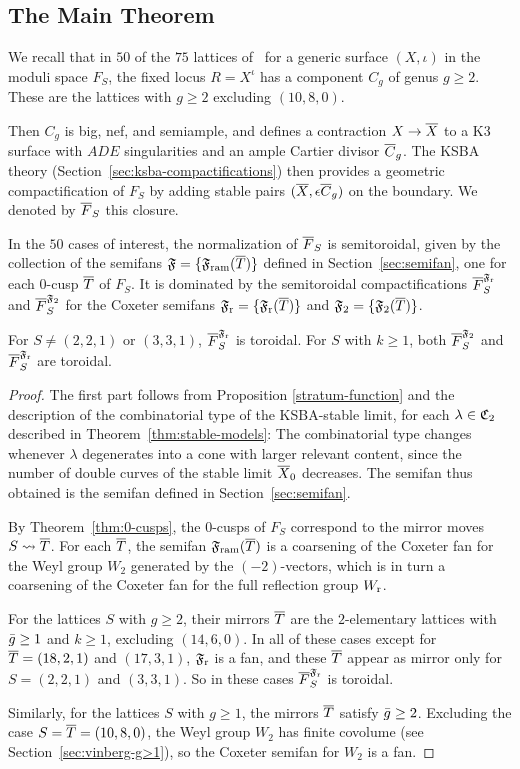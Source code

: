 \documentclass{amsart}
\begin{document}
\subsection{The Main Theorem}
\label{sec:proof-main-thm}

We recall that in $50$ of the $75$ lattices of \fign\ for a generic
surface $(X,\iota)$ in the moduli space $F_S$, the fixed locus
$R=X^\iota$ has a component $C_g$ of genus $g\ge2$.  These are the
lattices with $g\ge2$ excluding $(10,8,0)$.

Then $C_g$ is big, nef, and semiample, and defines a contraction
$X\to{\overline X}$ to a K3 surface with $ADE$ singularities and an ample
Cartier divisor ${\overline C}_g$. The KSBA theory
(Section~\ref{sec:ksba-compactifications}) then provides a geometric
compactification of $F_S$ by adding stable pairs $({\overline X},\epsilon{\overline C}_g)$
on the boundary. We denoted by ${\overline F}_S$ this closure.

\begin{theorem}\label{thm:compact-moduli}
  In the $50$ cases of interest, the normalization of
  ${\overline F}_S$ is semitoroidal, given by the collection of
  the semifans ${\mathfrak F}=\{{\mathfrak F}_{\rm ram}({\overline T})\}$ defined in
  Section~\ref{sec:semifan}, one for each $0$-cusp ${\overline T}$ of $F_S$.
  It is dominated by the semitoroidal compactifications
  ${\overline F}_S^{{\mathfrak F}_{\rm r}}$ and ${\overline F}_S^{{\mathfrak F}_2}$
  for the Coxeter semifans ${\mathfrak F}_{\rm r}=\{{\mathfrak F}_{\rm r}({\overline T})\}$ and ${\mathfrak F}_2=\{{\mathfrak F}_2({\overline T})\}$.
  
  For $S\ne(2,2,1)$ or $(3,3,1)$, ${\overline F}_S^{{\mathfrak F}_{\rm r}}$ is toroidal. For $S$
  with $k\ge1$, both ${\overline F}_S^{{\mathfrak F}_2}$ and ${\overline F}_S^{{\mathfrak F}_{\rm r}}$ are toroidal.
\end{theorem}

\begin{proof}
The first part follows from Proposition \ref{stratum-function}
and the description of the combinatorial type of the KSBA-stable 
limit, for each $\lambda\in {\mathfrak C}_2$ described in Theorem~\ref{thm:stable-models}:
The combinatorial type changes whenever $\lambda$ degenerates
into a cone with larger relevant content, since the number of double
curves of the stable limit ${\overline X}_0$ decreases. The semifan thus
obtained is the semifan defined in
Section~\ref{sec:semifan}.

By Theorem~\ref{thm:0-cusps}, the $0$-cusps of $F_S$ correspond to the
mirror moves $S\leadsto{\overline T}$. For each ${\overline T}$, the semifan ${\mathfrak F}_{\rm ram}({\overline T})$ is
a coarsening of the Coxeter fan for the Weyl group $W_2$ generated by
the $(-2)$-vectors, which is in turn a coarsening of the Coxeter fan for the
full reflection group $W_{\rm r}$.

For the lattices $S$ with $g\ge 2$, their mirrors ${\overline T}$ are the
$2$-elementary lattices with $\bar g\ge1$ and $k\ge1$, excluding
$(14,6,0)$. In all of these cases except for ${\overline T}=(18,2,1)$ and
$(17,3,1)$, ${\mathfrak F}_{\rm r}$ is a fan, and these ${\overline T}$ appear as mirror
only for $S=(2,2,1)$ and $(3,3,1)$. So in these cases ${\overline F}_S^{{\mathfrak F}_{\rm r}}$ is
toroidal.

Similarly, for the lattices $S$ with $g\ge1$, the mirrors ${\overline T}$
satisfy $\bar g\ge2$. Excluding the case $S={\overline T} = (10,8,0)$, the Weyl
group $W_2$ has finite covolume (see Section~\ref{sec:vinberg-g>1}),
so the Coxeter semifan for $W_2$ is a fan.
\end{proof}
\end{document}
